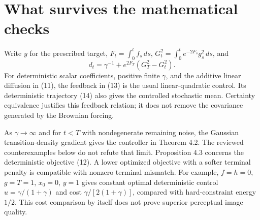 \documentclass[10pt]{article}
\begin{document}
\section*{What survives the mathematical checks}
Write \(y\) for the prescribed target, \(F_t=\int_0^t f_s\,ds\), \(G_t^2=\int_0^t e^{-2F_s}g_s^2\,ds\), and \[d_t=\gamma^{-1}+e^{2F_T}(G_T^2-G_t^2).\] For deterministic scalar coefficients, positive finite \(\gamma\), and the additive linear diffusion in (11), the feedback in (13) is the usual linear-quadratic control. Its deterministic trajectory (14) also gives the controlled stochastic mean. Certainty equivalence justifies this feedback relation; it does not remove the covariance generated by the Brownian forcing.\par
As \(\gamma\to\infty\) and for \(t<T\) with nondegenerate remaining noise, the Gaussian transition-density gradient gives the controller in Theorem 4.2. The reviewed counterexamples below do not refute that limit. Proposition 4.3 concerns the deterministic objective (12). A lower optimized objective with a softer terminal penalty is compatible with nonzero terminal mismatch. For example, \(f=h=0\), \(g=T=1\), \(x_0=0\), \(y=1\) gives constant optimal deterministic control \(u=\gamma/(1+\gamma)\) and cost \(\gamma/[2(1+\gamma)]\), compared with hard-constraint energy \(1/2\). This cost comparison by itself does not prove superior perceptual image quality.\par
\end{document}
